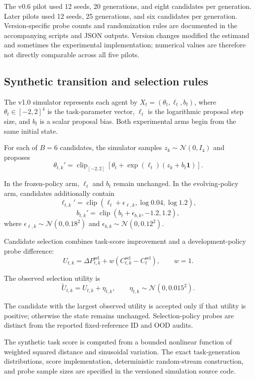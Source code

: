 \documentclass[11pt,a4paper]{article}
\begin{document}
The v0.6 pilot used 12 seeds, 20 generations, and eight candidates per generation. Later pilots used 12 seeds, 25 generations, and six candidates per generation. Version-specific probe counts and randomization rules are documented in the accompanying scripts and JSON outputs. Version changes modified the estimand and sometimes the experimental implementation; numerical values are therefore not directly comparable across all five pilots.

\subsection{Synthetic transition and selection rules}

The v1.0 simulator represents each agent by $X_t=(\theta_t,\ell_t,b_t)$, where $\theta_t\in[-2,2]^4$ is the task-parameter vector, $\ell_t$ is the logarithmic proposal step size, and $b_t$ is a scalar proposal bias. Both experimental arms begin from the same initial state.

For each of $B=6$ candidates, the simulator samples $z_k\sim\mathcal{N}(0,I_4)$ and proposes
\[
\theta_{t,k}'=
\operatorname{clip}_{[-2,2]}
\left[
\theta_t+\exp(\ell_t)(z_k+b_t\mathbf{1})
\right].
\]

In the frozen-policy arm, $\ell_t$ and $b_t$ remain unchanged. In the evolving-policy arm, candidates additionally contain
\[
\ell_{t,k}'=
\operatorname{clip}
\left(\ell_t+\epsilon_{\ell,k},
\log 0.04,\log 1.2\right),
\]
\[
b_{t,k}'=
\operatorname{clip}
\left(b_t+\epsilon_{b,k},-1.2,1.2\right),
\]
where
$\epsilon_{\ell,k}\sim\mathcal{N}(0,0.18^2)$
and
$\epsilon_{b,k}\sim\mathcal{N}(0,0.12^2)$.

Candidate selection combines task-score improvement and a development-policy probe difference:
\[
U_{t,k}=
\Delta P_{t,k}^{\mathrm{sel}}
+
w\left(
C_{t,k}^{\mathrm{sel}}
-
C_t^{\mathrm{sel}}
\right),
\qquad w=1.
\]

The observed selection utility is
\[
\widetilde U_{t,k}
=
U_{t,k}+\eta_{t,k},
\qquad
\eta_{t,k}\sim\mathcal{N}(0,0.015^2).
\]

The candidate with the largest observed utility is accepted only if that utility is positive; otherwise the state remains unchanged. Selection-policy probes are distinct from the reported fixed-reference ID and OOD audits.

The synthetic task score is computed from a bounded nonlinear function of weighted squared distance and sinusoidal variation. The exact task-generation distributions, score implementation, deterministic
random-stream construction, and probe sample sizes are specified in the versioned simulation source code.
\end{document}
